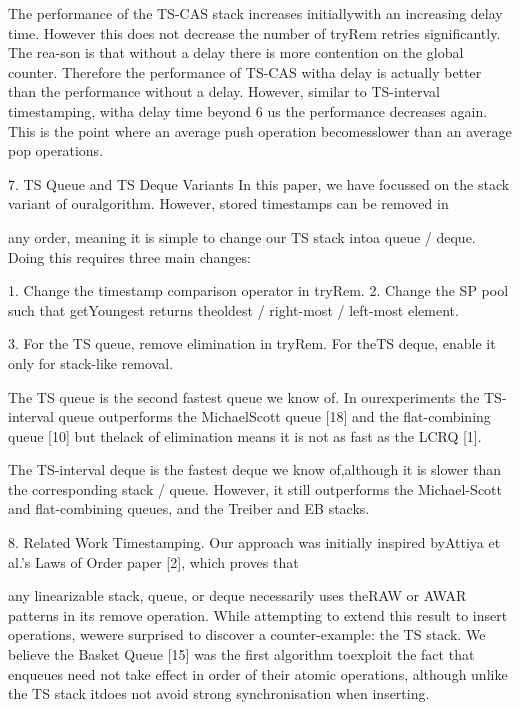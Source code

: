The performance of the TS-CAS stack increases initiallywith an increasing delay time. However this does not decrease the number of tryRem retries significantly. The rea-son is that without a delay there is more contention on the
global counter. Therefore the performance of TS-CAS witha delay is actually better than the performance without a
delay. However, similar to TS-interval timestamping, witha delay time beyond 6 us the performance decreases again.
This is the point where an average push operation becomesslower than an average pop operations.

7. TS Queue and TS Deque Variants
In this paper, we have focussed on the stack variant of ouralgorithm. However, stored timestamps can be removed in

any order, meaning it is simple to change our TS stack intoa queue / deque. Doing this requires three main changes:

1. Change the timestamp comparison operator in tryRem.
2. Change the SP pool such that getYoungest returns theoldest / right-most / left-most element.

3. For the TS queue, remove elimination in tryRem. For theTS deque, enable it only for stack-like removal.

The TS queue is the second fastest queue we know of. In ourexperiments the TS-interval queue outperforms the MichaelScott queue [18] and the flat-combining queue [10] but thelack of elimination means it is not as fast as the LCRQ [1].

The TS-interval deque is the fastest deque we know of,although it is slower than the corresponding stack / queue.
However, it still outperforms the Michael-Scott and flat-combining queues, and the Treiber and EB stacks.

8. Related Work
Timestamping. Our approach was initially inspired byAttiya et al.'s Laws of Order paper [2], which proves that

any linearizable stack, queue, or deque necessarily uses theRAW or AWAR patterns in its remove operation. While
attempting to extend this result to insert operations, wewere surprised to discover a counter-example: the TS stack.
We believe the Basket Queue [15] was the first algorithm toexploit the fact that enqueues need not take effect in order
of their atomic operations, although unlike the TS stack itdoes not avoid strong synchronisation when inserting.

